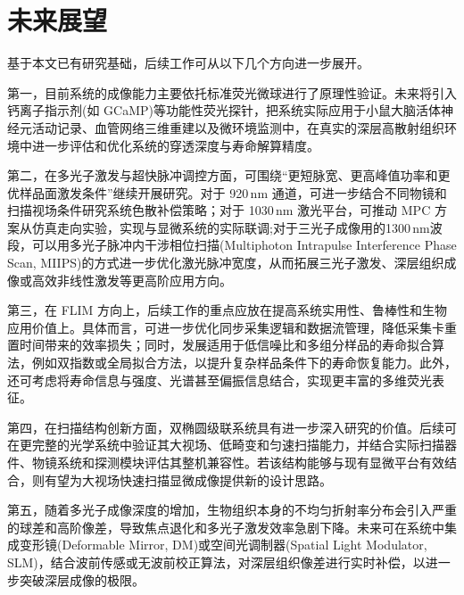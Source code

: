 \section{未来展望}\label{7.2}

基于本文已有研究基础，后续工作可从以下几个方向进一步展开。

第一，目前系统的成像能力主要依托标准荧光微球进行了原理性验证。未来将引入钙离子指示剂(如 GCaMP)等功能性荧光探针，把系统实际应用于小鼠大脑活体神经元活动记录、血管网络三维重建以及微环境监测中，在真实的深层高散射组织环境中进一步评估和优化系统的穿透深度与寿命解算精度。

第二，在多光子激发与超快脉冲调控方面，可围绕``更短脉宽、更高峰值功率和更优样品面激发条件''继续开展研究。对于 920\,nm 通道，可进一步结合不同物镜和扫描视场条件研究系统色散补偿策略；对于 1030\,nm 激光平台，可推动 MPC 方案从仿真走向实验，实现与显微系统的实际联调;对于三光子成像用的1300\,nm波段，可以用多光子脉冲内干涉相位扫描(Multiphoton Intrapulse Interference Phase Scan, MIIPS)的方式进一步优化激光脉冲宽度，从而拓展三光子激发、深层组织成像或高效非线性激发等更高阶应用方向。

第三，在 FLIM 方向上，后续工作的重点应放在提高系统实用性、鲁棒性和生物应用价值上。具体而言，可进一步优化同步采集逻辑和数据流管理，降低采集卡重置时间带来的效率损失；同时，发展适用于低信噪比和多组分样品的寿命拟合算法，例如双指数或全局拟合方法，以提升复杂样品条件下的寿命恢复能力。此外，还可考虑将寿命信息与强度、光谱甚至偏振信息结合，实现更丰富的多维荧光表征。

第四，在扫描结构创新方面，双椭圆级联系统具有进一步深入研究的价值。后续可在更完整的光学系统中验证其大视场、低畸变和匀速扫描能力，并结合实际扫描器件、物镜系统和探测模块评估其整机兼容性。若该结构能够与现有显微平台有效结合，则有望为大视场快速扫描显微成像提供新的设计思路。

第五，随着多光子成像深度的增加，生物组织本身的不均匀折射率分布会引入严重的球差和高阶像差，导致焦点退化和多光子激发效率急剧下降。未来可在系统中集成变形镜(Deformable Mirror, DM)或空间光调制器(Spatial Light Modulator, SLM)，结合波前传感或无波前校正算法，对深层组织像差进行实时补偿，以进一步突破深层成像的极限。